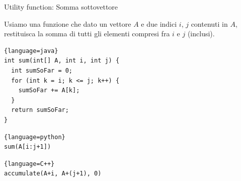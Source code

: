 \begin{frame}[fragile]{Utility function: Somma sottovettore}

Usiamo una funzione che dato un vettore $A$ e due indici $i$, $j$ contenuti in $A$, restituisca la somma di tutti gli elementi compresi fra $i$ e $j$ (inclusi).

\small
\begin{myboxtitle}[Java]
\vspace{-9pt}
\begin{lstlisting}{language=java}
int sum(int[] A, int i, int j) {
  int sumSoFar = 0;
  for (int k = i; k <= j; k++) {
    sumSoFar += A[k];
  }
  return sumSoFar;
}
\end{lstlisting}
\vspace{-6pt}
\end{myboxtitle}
\begin{multicols}{2}
\vspace{-6pt}
\begin{myboxtitle}[Python]
\vspace{-9pt}
\begin{lstlisting}{language=python}
sum(A[i:j+1])
\end{lstlisting}
\vspace{-6pt}
\end{myboxtitle}
\vspace{-6pt}
\begin{myboxtitle}[C++]
\vspace{-9pt}
\begin{lstlisting}{language=C++}
accumulate(A+i, A+(j+1), 0)
\end{lstlisting}
\vspace{-6pt}
\end{myboxtitle}
\end{multicols}


\end{frame}

%
%
%
%
%
%
%



